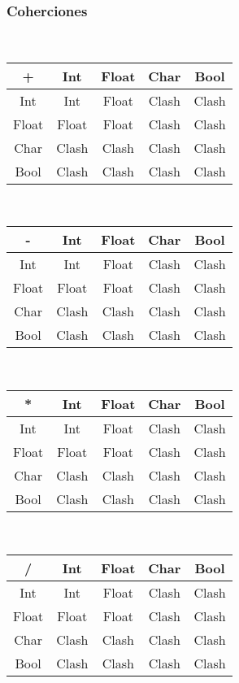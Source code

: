 \documentclass[12pt, spanish]{report}
\begin{document}
\subsubsection{Coherciones}
\\
\begin{tabular}{|c||cccc|}
	\hline
+      &  Int  & Float & Char  & Bool  \\
	\hline \hline
Int    &  Int  & Float & Clash & Clash \\
Float  & Float & Float & Clash & Clash \\
Char   & Clash & Clash & Clash & Clash \\
Bool   & Clash & Clash & Clash & Clash \\
	\hline
\end{tabular}
\\
\begin{tabular}{|c||cccc|}
	\hline
-      &  Int  & Float & Char  & Bool  \\
	\hline \hline
Int    &  Int  & Float & Clash & Clash \\
Float  & Float & Float & Clash & Clash \\
Char   & Clash & Clash & Clash & Clash \\
Bool   & Clash & Clash & Clash & Clash \\
	\hline
\end{tabular}
\\
\begin{tabular}{|c||cccc|}
	\hline
*      &  Int  & Float & Char  & Bool  \\
	\hline \hline
Int    &  Int  & Float & Clash & Clash \\
Float  & Float & Float & Clash & Clash \\
Char   & Clash & Clash & Clash & Clash \\
Bool   & Clash & Clash & Clash & Clash \\
	\hline
\end{tabular}
\\
\begin{tabular}{|c||cccc|}
	\hline
/      &  Int  & Float & Char  & Bool  \\
	\hline \hline
Int    &  Int  & Float & Clash & Clash \\
Float  & Float & Float & Clash & Clash \\
Char   & Clash & Clash & Clash & Clash \\
Bool   & Clash & Clash & Clash & Clash \\
	\hline
\end{tabular}
\end{document}
